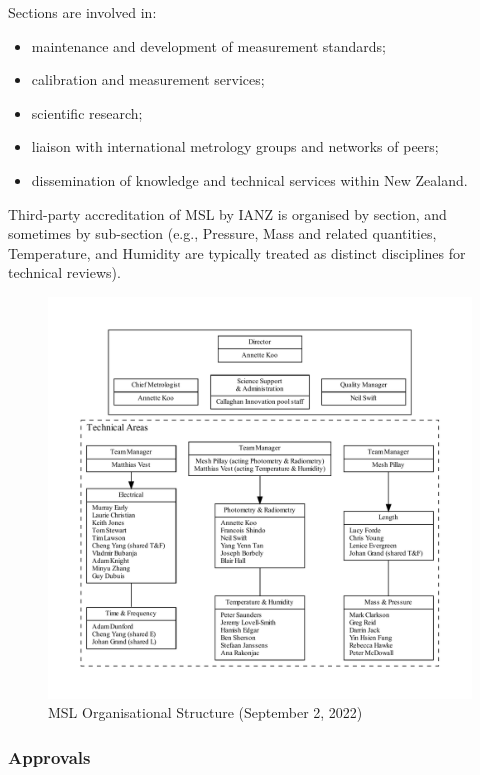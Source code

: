 Sections are involved in:
\begin{itemize}
\item	maintenance and development of measurement standards; 
\item	calibration and measurement services;
\item	scientific research;
\item	liaison with international metrology groups and networks of peers; 
\item	dissemination of knowledge and technical services within New Zealand.
\end{itemize}

Third-party accreditation of MSL by IANZ is organised by section, and sometimes by sub-section (e.g., Pressure, Mass and related quantities, Temperature, and Humidity are typically treated as distinct disciplines for technical reviews).

\begin{figure}
\begin{center}
\includegraphics[width=1.1\textwidth]{pictures/MSL_org_full}
\end{center}
\caption{MSL Organisational Structure (September 2, 2022)}
\label{fig:org_msl}
\end{figure}


\subsubsection{Approvals}
